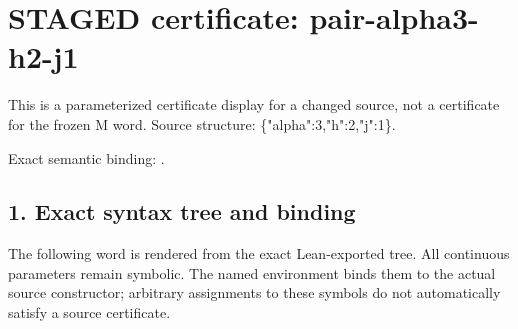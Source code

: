 \section*{STAGED certificate: pair-alpha3-h2-j1}
This is a parameterized certificate display for a changed source, not a certificate for the frozen M word.
Source structure: \{"alpha":3,"h":2,"j":1\}.

\noindent Exact semantic binding: .

\subsection*{1. Exact syntax tree and binding}
The following word is rendered from the exact Lean-exported tree. All continuous parameters remain symbolic. The named environment binds them to the actual source constructor; arbitrary assignments to these symbols do not automatically satisfy a source certificate.

